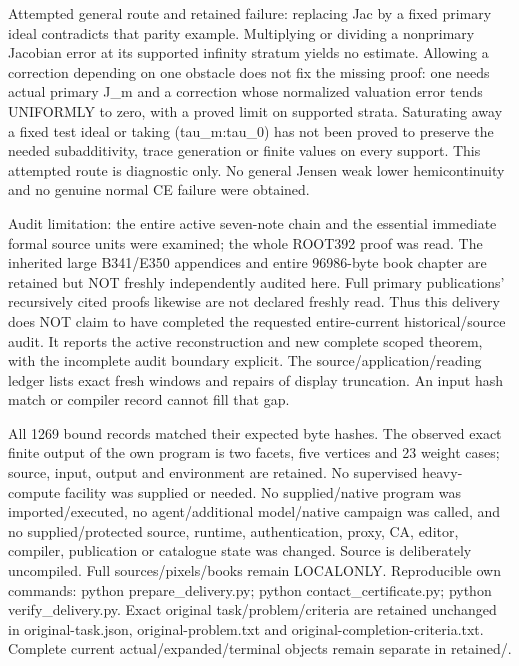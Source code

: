 \documentclass[11pt]{article}
\begin{document}
Attempted general route and retained failure: replacing Jac by a fixed primary ideal contradicts that parity example. Multiplying or dividing a nonprimary Jacobian error at its supported infinity stratum yields no estimate. Allowing a correction depending on one obstacle does not fix the missing proof: one needs actual primary J\_m and a correction whose normalized valuation error tends UNIFORMLY to zero, with a proved limit on supported strata. Saturating away a fixed test ideal or taking (tau\_m:tau\_0) has not been proved to preserve the needed subadditivity, trace generation or finite values on every support. This attempted route is diagnostic only. No general Jensen weak lower hemicontinuity and no genuine normal CE failure were obtained.

Audit limitation: the entire active seven-note chain and the essential immediate formal source units were examined; the whole ROOT392 proof was read. The inherited large B341/E350 appendices and entire 96986-byte book chapter are retained but NOT freshly independently audited here. Full primary publications' recursively cited proofs likewise are not declared freshly read. Thus this delivery does NOT claim to have completed the requested entire-current historical/source audit. It reports the active reconstruction and new complete scoped theorem, with the incomplete audit boundary explicit. The source/application/reading ledger lists exact fresh windows and repairs of display truncation. An input hash match or compiler record cannot fill that gap.

All 1269 bound records matched their expected byte hashes. The observed exact finite output of the own program is two facets, five vertices and 23 weight cases; source, input, output and environment are retained. No supervised heavy-compute facility was supplied or needed. No supplied/native program was imported/executed, no agent/additional model/native campaign was called, and no supplied/protected source, runtime, authentication, proxy, CA, editor, compiler, publication or catalogue state was changed. Source is deliberately uncompiled. Full sources/pixels/books remain LOCALONLY. Reproducible own commands: python prepare\_delivery.py; python contact\_certificate.py; python verify\_delivery.py. Exact original task/problem/criteria are retained unchanged in original-task.json, original-problem.txt and original-completion-criteria.txt. Complete current actual/expanded/terminal objects remain separate in retained/.
\end{document}
